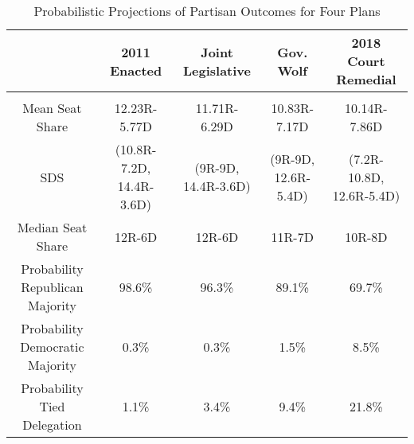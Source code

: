 \begin{landscape}
\begin{table}[!htbp] \centering 
  \caption{Probabilistic Projections of Partisan Outcomes for Four Plans} 
  \label{tab:prob} 
\begin{tabular}{@{\extracolsep{-5pt}} ccccc} 
 & 2011 Enacted & Joint Legislative & Gov. Wolf & 2018 Court Remedial \\ 
\hline \\[-1.8ex] 
Mean Seat Share & 12.23R-5.77D & 11.71R-6.29D & 10.83R-7.17D & 10.14R-7.86D \\ 
SDS & (10.8R-7.2D, 14.4R-3.6D) & (9R-9D, 14.4R-3.6D) & (9R-9D, 12.6R-5.4D) & (7.2R-10.8D, 12.6R-5.4D) \\ 
Median Seat Share & 12R-6D & 12R-6D & 11R-7D & 10R-8D \\ 
Probability Republican Majority & 98.6\% & 96.3\% & 89.1\% & 69.7\% \\ 
Probability Democratic Majority & 0.3\% & 0.3\% & 1.5\% & 8.5\% \\ 
Probability Tied Delegation & 1.1\% & 3.4\% & 9.4\% & 21.8\% \\ 
\end{tabular}
\end{table}
\end{landscape}
